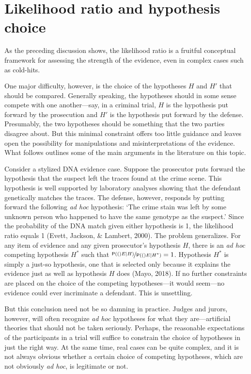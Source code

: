 \documentclass[10pt,dvipsnames,enabledeprecatedfontcommands]{scrartcl}
\newcommand{\pr}[1]{\mathsf{P}(#1)}
\begin{document}
\hypertarget{likelihood-ratio-and-hypothesis-choice}{%
\section{\texorpdfstring{Likelihood ratio and hypothesis choice
\label{subsec:LRandHypothesisChoice}}{Likelihood ratio and hypothesis choice }}\label{likelihood-ratio-and-hypothesis-choice}}

As the preceding discussion shows, the likelihood ratio is a fruitful
conceptual framework for assessing the strength of the evidence, even in
complex cases such as cold-hits.

One major difficulty, however, is the choice of the hypotheses \(H\) and
\(H'\) that should be compared. Generally speaking, the hypotheses
should in some sense compete with one another---say, in a criminal
trial, \(H\) is the hypothesis put forward by the prosecution and \(H'\)
is the hypothesis put forward by the defense. Presumably, the two
hypotheses should be something that the two parties disagree about. But
this minimal constraint offers too little guidance and leaves open the
possibility for manipulations and misinterpretations of the evidence.
What follows outlines some of the main arguments in the literature on
this topic.

Consider a stylized DNA evidence case. Suppose the prosecutor puts
forward the hypothesis that the suspect left the traces found at the
crime scene. This hypothesis is well supported by laboratory analyses
showing that the defendant genetically matches the traces. The defense,
however, responds by putting forward the following \textit{ad hoc}
hypothesis: `The crime stain was left by some unknown person who
happened to have the same genotype as the suspect.' Since the
probability of the DNA match given either hypothesis is 1, the
likelihood ratio equals 1 (Evett, Jackson, \& Lambert, 2000). The
problem generalizes. For any item of evidence and any given prosecutor's
hypothesis \(H\), there is an \textit{ad hoc} competing hypothesis
\(H^*\) such that \(\nicefrac{\pr(E \vert H)}{\pr(E \vert H^*)}=1\).
Hypothesis \(H^*\) is simply a just-so hypothesis, one that is selected
only because it explains the evidence just as well as hypothesis \(H\)
does (Mayo, 2018). If no further constraints are placed on the choice of
the competing hypotheses---it would seem---no evidence could ever
incriminate a defendant. This is unsettling.

But this conclusion need not be so damning in practice. Judges and
jurors, however, will often recognize \textit{ad hoc} hypotheses for
what they are---artificial theories that should not be taken seriously.
Perhaps, the reasonable expectations of the participants in a trial will
suffice to constrain the choice of hypotheses in just the right way. At
the same time, real cases can be quite complex, and it is not always
obvious whether a certain choice of competing hypotheses, which are not
obviously \textit{ad hoc}, is legitimate or not.
\end{document}
